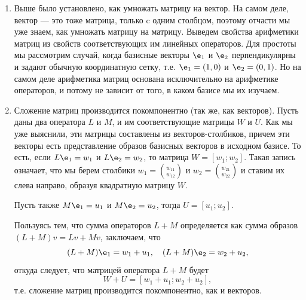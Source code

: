 \begin{enumerate}
\item Выше было установлено, как умножать матрицу на вектор. На самом деле, вектор --- это тоже матрица, только c одним столбцом, поэтому отчасти мы уже знаем, как умножать матрицу на матрицу. Выведем свойства арифметики матриц из свойств соответствующих им линейных операторов. Для простоты мы рассмотрим случай, когда базисные векторы $\e_1$ и $\e_2$ перпендикулярны и задают обычную координатную сетку, т.е. $\e_1=(1,0)$ и $\e_2=(0,1)$. Но на самом деле арифметика матриц основана исключительно на арифметике операторов, и потому не зависит от того, в каком базисе мы их изучаем.
\item Сложение матриц производится покомпонентно (так же, как векторов). Пусть даны два оператора $L$ и $M$, и им соответствующие матрицы $W$ и $U$. Как мы уже выяснили, эти матрицы составлены из векторов-столбиков, причем эти векторы есть представление образов базисных векторов в исходном базисе. То есть, если $L\e_1=w_1$ и $L\e_2=w_2$, то матрица $W=[w_1;w_2]$. Такая запись означает, что мы берем столбики $w_1=\binom{w_{11}}{w_{12}}$ и $w_2=\binom{w_{21}}{w_{22}}$ и ставим их слева направо, образуя квадратную матрицу $W$.

Пусть также $M\e_1=u_1$ и $M\e_2=u_2$, тогда $U=[u_1;u_2]$.

Пользуясь тем, что сумма операторов $L+M$ определяется как сумма образов $(L+M)v=Lv+Mv$, заключаем, что 
$$
(L+M)\e_1=w_1+u_1,\quad (L+M)\e_2=w_2+u_2,
$$
откуда следует, что матрицей оператора $L+M$ будет
$$
W+U = [w_1+u_1;w_2+u_2],
$$
т.е. сложение матриц производится покомпонентно, как и векторов.


\end{enumerate}
